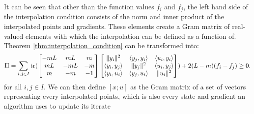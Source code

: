 It can be seen that other than the function values $f_i$ and $f_j$, the left hand side of the interpolation condition consists of the norm and inner product of the interpolated points and gradients. These elements create a Gram matrix of real-valued elements with which the interpolation can be defined as a function of. Theorem \ref{thm:interpolation_condition} can be transformed into:
\begin{equation} \label{eqn:condGram}
	\Pi = \sum_{i,j\in I} \operatorname{\mathrm{tr}}(\begin{bmatrix}-mL & mL & m \\ mL & -mL & -m\\m & -m & -1\end{bmatrix}\begin{bmatrix}\|y_i\|^2 & \langle y_j, y_i \rangle & \langle u_i, y_i \rangle \\ \langle y_i, y_j \rangle & \|y_j\|^2 & \langle u_i, y_j \rangle \\ \langle y_i, u_i \rangle & \langle y_j, u_i \rangle & \|u_i\|^2\end{bmatrix}) + 2(L-m)(f_i - f_j) \geq 0.
\end{equation}
for all $i,j\in I$. We can then define $[x; u]$ as the Gram matrix of a set of vectors representing every interpolated points, which is also every state and gradient an algorithm uses to update its iterate


